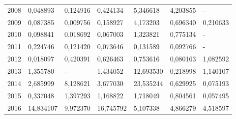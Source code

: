 \begin{table}
\begin{tabular}{p{1cm}p{2cm}p{2cm}p{2cm}p{2cm}p{2cm}p{2cm}}
 2008 &                            0,048893 &                        0,124916 &                  0,424134 &                                    5,346618 &                               4,203855 &                          - \\
 2009 &                            0,087385 &                        0,009756 &                  0,158927 &                                    4,173203 &                               0,696340 &                   0,210633 \\
 2010 &                            0,098841 &                        0,018692 &                  0,067003 &                                    1,323821 &                               0,775134 &                          - \\
 2011 &                            0,224746 &                        0,121420 &                  0,073646 &                                    0,131589 &                               0,092766 &                          - \\
 2012 &                            0,018097 &                        0,420391 &                  0,626463 &                                    0,753616 &                               0,080163 &                   1,082592 \\
 2013 &                            1,355780 &                               - &                  1,434052 &                                   12,693530 &                               0,218998 &                   1,140107 \\
 2014 &                            2,685999 &                        8,128621 &                  3,677030 &                                   23,535244 &                               0,629925 &                   0,075193 \\
 2015 &                            0,337048 &                        1,397293 &                  1,168822 &                                    1,718049 &                               0,804561 &                   0,057495 \\
 2016 &                           14,834107 &                        9,972370 &                 16,745792 &                                    5,107338 &                               4,866279 &                   4,518597 \\
\bottomrule
\end{tabular}
\end{table}
